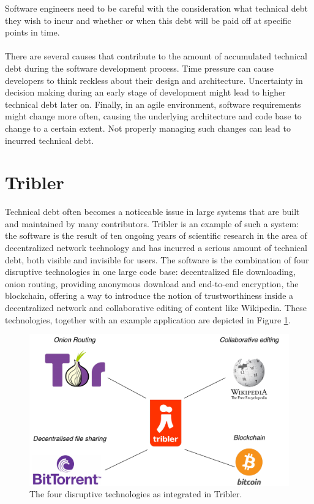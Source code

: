 Software engineers need to be careful with the consideration what technical debt they wish to incur and whether or when this debt will be paid off at specific points in time.\\\\
There are several causes that contribute to the amount of accumulated technical debt during the software development process\cite{martini2014architecture}. Time pressure can cause developers to think reckless about their design and architecture. Uncertainty in decision making during an early stage of development might lead to higher technical debt later on. Finally, in an agile environment, software requirements might change more often, causing the underlying architecture and code base to change to a certain extent. Not properly managing such changes can lead to incurred technical debt.

\section{Tribler}
Technical debt often becomes a noticeable issue in large systems that are built and maintained by many contributors. Tribler is an example of such a system: the software is the result of ten ongoing years of scientific research in the area of decentralized network technology and has incurred a serious amount of technical debt, both visible and invisible for users.
The software is the combination of four disruptive technologies in one large code base: decentralized file downloading, onion routing, providing anonymous download and end-to-end encryption, the blockchain, offering a way to introduce the notion of trustworthiness inside a decentralized network and collaborative editing of content like Wikipedia. These technologies, together with an example application are depicted in Figure \ref{fig:tribler-connections}.\\

\begin{figure}[h!]
	\centering
	\includegraphics[width=0.6\columnwidth]{images/introduction/tribler_connections}
	\caption{The four disruptive technologies as integrated in Tribler.}
	\label{fig:tribler-connections}
\end{figure}

